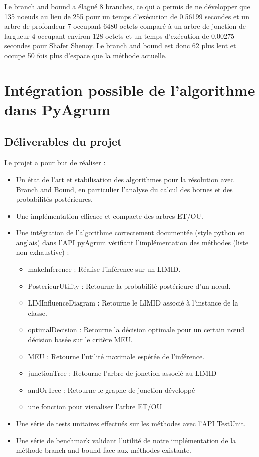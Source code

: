 \documentclass[12pt]{article}
\begin{document}
Le branch and bound a élagué 8 branches, ce qui a permis de ne développer que 135 noeuds au lieu de 255 pour un temps d'exécution de 0.56199 secondes et un arbre de profondeur 7 occupant 6480 octets comparé à un arbre de jonction de largueur 4 occupant environ 128 octets et un temps d'exécution de 0.00275 secondes pour Shafer Shenoy. Le branch and bound est donc 62 plus lent et occupe 50 fois plus d'espace que la méthode actuelle.
\section{Intégration possible de l'algorithme dans PyAgrum}
\subsection{Déliverables du projet}
Le projet a pour but de réaliser :
\begin{itemize}
\item Un état de l'art et stabilisation des algorithmes pour la résolution avec Branch and Bound, en particulier l'analyse du calcul des bornes et des probabilités postérieures.
\item Une implémentation efficace et compacte des arbres ET/OU.

\item Une intégration de l'algorithme correctement documentée (style python en anglais) dans l'API pyAgrum vérifiant l'implémentation des méthodes (liste non exhaustive) :
\begin{itemize}
    \item makeInference : Réalise l'inférence sur un LIMID.
    \item PosterieurUtility : Retourne la probabilité postérieure d'un nœud.
    \item LIMInfluenceDiagram : Retourne le LIMID associé à l'instance de la classe.
    \item optimalDecision : Retourne la décision optimale pour un certain nœud décision basée sur le critère MEU.
    \item MEU : Retourne l'utilité maximale espérée de l'inférence.
    \item junctionTree : Retourne l'arbre de jonction associé au LIMID
    \item andOrTree : Retourne le graphe de jonction développé
    \item une fonction pour visualiser l'arbre ET/OU
\end{itemize}
\item Une série de tests unitaires effectués sur les méthodes avec l'API TestUnit.
\item Une série de benchmark validant l'utilité de notre implémentation de la méthode branch and bound face aux méthodes existante.
\end{itemize}
\end{document}
